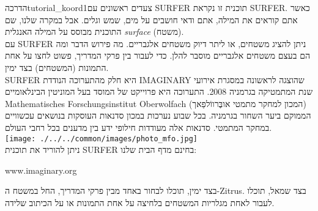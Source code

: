 \begin{surferIntroPage}{הדרכה}{tutorial_koord1}{צעדים ראשונים עם SURFER}
תוכנית זו נקראת SURFER. כאשר אתם קוראים את המילה, אתם ודאי חושבים על מים, שמש וגלים. אבל במקרה שלנו, שם התוכנית מבוסס על המילה האנגלית {\it surface} (משטח).
\\
עם SURFER ניתן להציג משטחים, או ליתר דיוק משטחים אלגבריים. מה פירוש הדבר ומה הם בעצם משטחים אלגבריים מוסבר להלן. כדי לעבור בין פרקי המדריך, פשוט לחצו על אחת התמונות (המשטחים) בצד ימין.\\
SURFER היא חלק מהתערוכה הנודדת IMAGINARY שהוצגה לראשונה במסגרת אירועי שנת המתמטיקה בגרמניה 2008. התערוכה היא פרוייקט של המוסד בעל המוניטין הבינלאומיים Mathematisches Forschungsinstitut Oberwolfach (המכון למחקר מתמטי אובֶּרווֹלפַאך) הממוקם ביער השחור בגרמניה. בכל שבוע נערכות במכון סדנאות העוסקות בנושאים עכשוויים במחקר המתמטי. סדנאות אלה מעודדות חילופי ידע בין מדענים בכל רחבי העולם. \\
\vspace{0.2cm} \hspace{3.5cm}\texttt{[image: ./../../common/images/photo\_mfo.jpg]}\\
ניתן להוריד את תוכנית SURFER בחינם מדף הבית שלנו: \\
\begin{centering}
www.imaginary.org\\
\end{centering}
 \vspace{0,2cm}
בצד ימין, תוכלו לבחור באחד מבין פרקי המדריך, החל במשטח ה-Zitrus. בצד שמאל, תוכלו לעבור לאחת מגלריות המשטחים בלחיצה על אחת התמונות או על הכיתוב שלידה.
\end{surferIntroPage}
